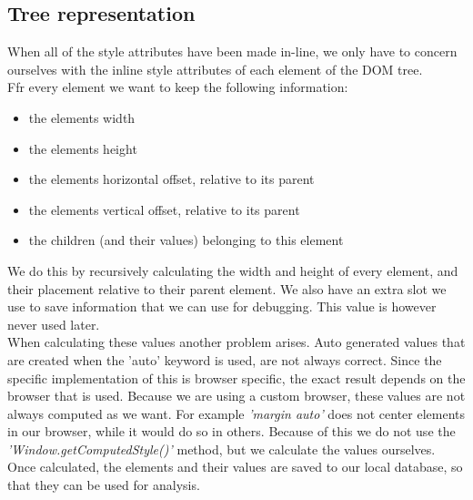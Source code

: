 \subsection{Tree representation}
 When all of the style attributes have been made in-line, we only have to concern ourselves with the inline style attributes of each element of the DOM tree.
\\Ffr every element we want to keep the following information:
\begin{itemize}
	\item the elements width
	\item the elements height
	\item the elements horizontal offset, relative to its parent
	\item the elements vertical offset, relative to its parent
	\item the children (and their values) belonging to this element
\end{itemize}
We do this by recursively calculating the width and height of every element, and their placement relative to their parent element. We also have an extra slot we use to save information that we can use for debugging. This value is however never used later.
\\When calculating these values another problem arises. Auto generated values that are created when the 'auto' keyword is used, are not always correct. Since the specific implementation of this is browser specific, the exact result depends on the browser that is used. Because we are using a custom browser, these values are not always computed as we want. For example \textit{'margin auto'} does not center elements in our browser, while it would do so in others. Because of this we do not use the \textit{'Window.getComputedStyle()'} method, but we calculate the values ourselves. 
\\Once calculated, the elements and their values are saved to our local database, so that they can be used for analysis.

